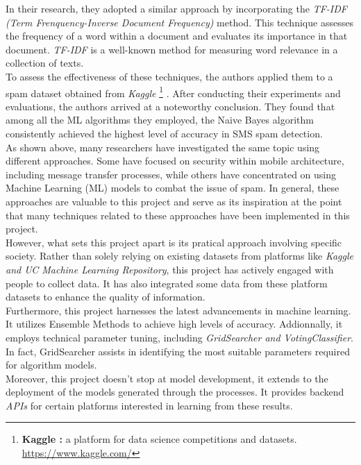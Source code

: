 \documentclass[12pt,a4paper, oneside]{book}
\begin{document}
	In their research, they adopted a similar approach by incorporating the \textit{TF-IDF (Term Frenquency-Inverse Document Frequency)} method. This technique assesses the frequency of a word within a document and evaluates its importance in that document. \textit{TF-IDF} is a well-known method for measuring word relevance in a collection of texts.\\
	
	To assess the effectiveness of these techniques, the authors applied them to a spam dataset obtained from \textit{Kaggle} 
	\footnote{ \textbf{Kaggle :} a platform for data science competitions and datasets. \url{https://www.kaggle.com/}}
	. After conducting their experiments and evaluations, the authors arrived at a noteworthy conclusion. They found that among all the ML algorithms they employed, the Naive Bayes algorithm consistently achieved the highest level of accuracy in SMS spam detection.\\
	
	As shown above, many researchers have investigated the same topic using different approaches. Some have focused on security within mobile architecture, including message transfer processes, while others have concentrated on using Machine Learning (ML) models to combat the issue of spam. In general, these approaches are valuable to this project and serve as its inspiration at the point that many techniques related to these approaches have been implemented in this project.\\

    However, what sets this project apart is its pratical approach involving specific society. Rather than solely relying on existing datasets from platforms like \textit{Kaggle and UC Machine Learning Repository}, this project has actively engaged with people to collect data. It has also integrated some data from these platform datasets to enhance the quality of information. \\
        
    Furthermore, this project harnesses the latest advancements in machine learning. It utilizes Ensemble Methods to achieve high levels of accuracy. Addionnally, it employs technical parameter tuning, including \textit{GridSearcher and VotingClassifier}. In fact, GridSearcher assists in identifying the most suitable parameters required for algorithm models. \\
    
    Moreover, this project doesn't stop at model development, it extends to the deployment of the models generated through the processes. It provides backend \textit{APIs} for certain platforms interested in learning from these results. \\
    
\end{document}
